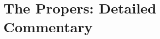 \newcommand{\TriptychBriefSynthesis}{%

}
\TriptychBriefSynthesis
\label{triptych:brief-synthesis:next}

\section*{The Propers: Detailed Commentary}
